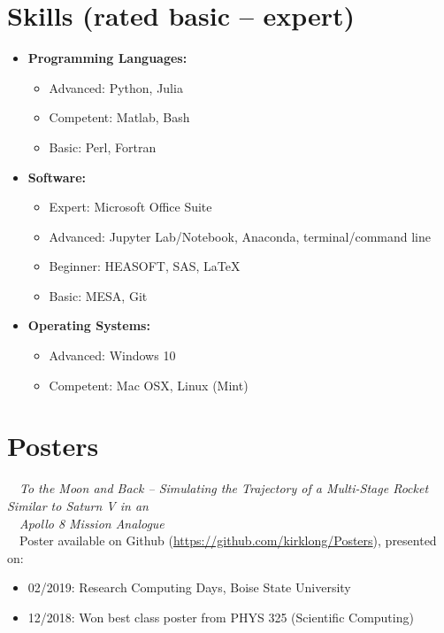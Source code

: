 \documentclass[11pt]{article}
\begin{document}
\section{Skills (rated basic -- expert)}
\begin{itemize}[noitemsep]
\item \textbf{Programming Languages:}
    \begin{itemize}[noitemsep]
    \item Advanced: Python, Julia
    \item Competent: Matlab, Bash
    \item Basic: Perl, Fortran
    \end{itemize}
\item \textbf{Software:}
    \begin{itemize}[noitemsep]
    \item Expert: Microsoft Office Suite
    \item Advanced: Jupyter Lab/Notebook, Anaconda, terminal/command line
    \item Beginner: HEASOFT, SAS, LaTeX
    \item Basic: MESA, Git
    \end{itemize}
\item \textbf{Operating Systems:}
    \begin{itemize}[noitemsep]
    \item Advanced: Windows 10
    \item Competent: Mac OSX, Linux (Mint)
    \end{itemize}
\end{itemize}

\section{Posters}
\-\ \-\ \textit{To the Moon and Back -- Simulating the Trajectory of a Multi-Stage Rocket Similar to Saturn V in an} \\
\-\ \-\ \textit{Apollo 8 Mission Analogue}\vspace{1mm}\\
\-\ \-\ Poster available on Github (\url{https://github.com/kirklong/Posters}), presented on:
\-\ \-\ \begin{itemize}[noitemsep]
              \item 02/2019: Research Computing Days, Boise State University
              \item 12/2018: Won best class poster from PHYS 325 (Scientific Computing)
        \end{itemize}
\end{document}
